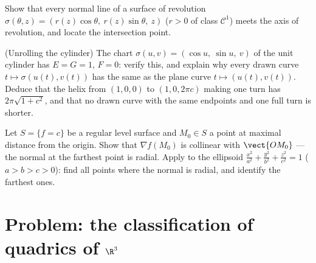\begin{exercise}[$\star\star$]\label{exo:b2:surfaces:10}
Show that every normal line of a surface of revolution
$\sigma(\theta, z) = (r(z)\cos\theta,\ r(z)\sin\theta,\ z)$
($r > 0$ of class $\mathcal C^1$) meets the axis of
revolution, and locate the intersection point.
\end{exercise}

\begin{exercise}[$\star\star$]\label{exo:b2:surfaces:11}
(Unrolling the cylinder) The chart $\sigma(u, v) = (\cos u,\
\sin u,\ v)$ of the unit cylinder has $E = G = 1$, $F = 0$:
verify this, and explain why every drawn curve $t \mapsto
\sigma(u(t), v(t))$ has the same  as the plane curve $t
\mapsto (u(t), v(t))$. Deduce that the helix from $(1, 0, 0)$
to $(1, 0, 2\pi c)$ making one turn has 
$2\pi\sqrt{1 + c^2}$, and that no drawn curve with the same
endpoints and one full turn is shorter.
\end{exercise}

\begin{exercise}[$\star\star\star$]\label{exo:b2:surfaces:12}
Let $S = \{f = c\}$ be a  regular level surface and
$M_0 \in S$ a point at maximal distance from the origin. Show
that $\nabla f(M_0)$ is collinear with $\vect{OM_0}$ --- the
normal at the farthest point is radial. Apply to the ellipsoid
$\frac{x^2}{a^2} + \frac{y^2}{b^2} + \frac{z^2}{c^2} = 1$ ($a >
b > c > 0$): find all points where the normal is radial, and
identify the farthest ones.
\end{exercise}

\section{Problem: the classification of quadrics of
$\R^3$}

